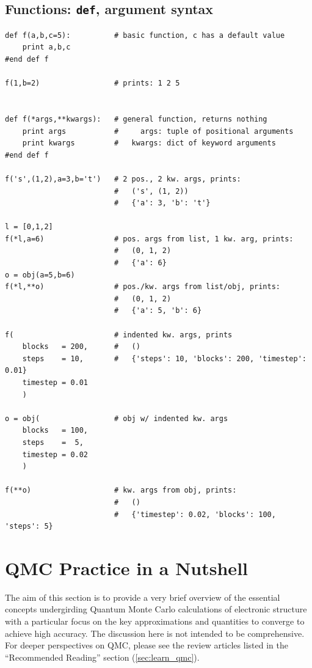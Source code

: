 \documentclass[oneside,11pt]{memoir}
\numberwithin{equation}{section}
\begin{document}
\section{Functions: \texttt{def}, argument syntax}
\begin{shaded}
\begin{verbatim}
def f(a,b,c=5):          # basic function, c has a default value
    print a,b,c
#end def f

f(1,b=2)                 # prints: 1 2 5


def f(*args,**kwargs):   # general function, returns nothing
    print args           #     args: tuple of positional arguments
    print kwargs         #   kwargs: dict of keyword arguments
#end def f

f('s',(1,2),a=3,b='t')   # 2 pos., 2 kw. args, prints:
                         #   ('s', (1, 2))
                         #   {'a': 3, 'b': 't'}

l = [0,1,2]
f(*l,a=6)                # pos. args from list, 1 kw. arg, prints:
                         #   (0, 1, 2)
                         #   {'a': 6}
o = obj(a=5,b=6)
f(*l,**o)                # pos./kw. args from list/obj, prints:
                         #   (0, 1, 2)
                         #   {'a': 5, 'b': 6}

f(                       # indented kw. args, prints
    blocks   = 200,      #   () 
    steps    = 10,       #   {'steps': 10, 'blocks': 200, 'timestep': 0.01}
    timestep = 0.01
    )

o = obj(                 # obj w/ indented kw. args
    blocks   = 100,
    steps    =  5,
    timestep = 0.02
    )

f(**o)                   # kw. args from obj, prints:
                         #   ()
                         #   {'timestep': 0.02, 'blocks': 100, 'steps': 5}
\end{verbatim}
\end{shaded}





\pagebreak
\chapter{QMC Practice in a Nutshell}\label{app:theory}
The aim of this section is to provide a very brief overview of the 
essential concepts undergirding Quantum Monte Carlo calculations 
of electronic structure with a particular focus on the key 
approximations and quantities to converge to achieve high
accuracy.  The discussion here is not intended to be comprehensive. 
For deeper perspectives on QMC, please see the review articles 
listed in the ``Recommended Reading'' section (\ref{sec:learn_qmc}).
\end{document}
